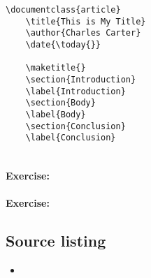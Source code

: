         \begin{verbatim}
\documentclass{article}
    \title{This is My Title}
    \author{Charles Carter}
    \date{\today{}}
 
    \maketitle{}
    \section{Introduction}
    \label{Introduction}
    \section{Body}
    \label{Body}
    \section{Conclusion}
    \label{Conclusion}
    
        \end{verbatim}

        \paragraph{Exercise:}

        \paragraph{Exercise:}


        \subsection{Source listing}
        \label{Source listing}
        
        \begin{framed}
            \begin{itemize}
                \item{}
            \end{itemize}
        \end{framed}


